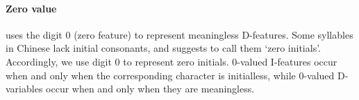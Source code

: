\paragraph{Zero value} \citet{hayes2011} uses the digit 0 (zero feature) to represent meaningless D-features. 
Some syllables in Chinese lack initial consonants, and \citet[pp.18--23]{chao1968} suggests to call them `zero initials'. 
Accordingly, we use digit 0 to represent zero initials.
0-valued I-features occur when and only when the corresponding character is initialless, 
  while 0-valued D-variables occur when and only when they are meaningless.



